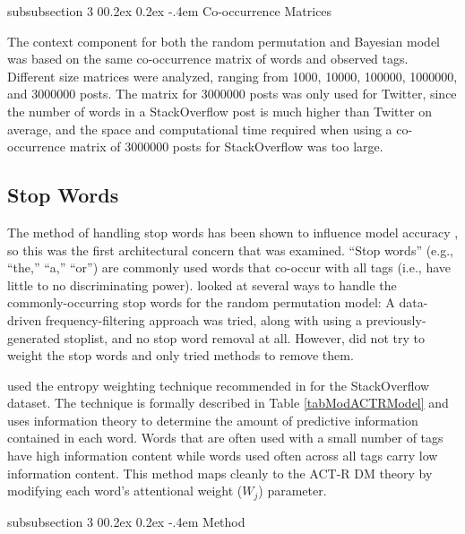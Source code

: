 \documentclass[man,floatsintext,donotrepeattitle]{apa6}
\makeatletter
\renewcommand{\subsubsection}{%
  \@startsection
  {subsubsection}%
  {3}%
  {\parindent}%
  {0\baselineskip \@plus 0.2ex \@minus 0.2ex}%
  {-.4em}%
  {\normalfont\normalsize\bfseries\addperi}}
\makeatother
\begin{document}
\subsubsection{Co-occurrence Matrices}

The context component for both the random permutation and Bayesian model was based on the same co-occurrence matrix of words and observed tags.
Different size matrices were analyzed, ranging from \num{1000}, \num{10000}, \num{100000}, \num{1000000}, and \num{3000000} posts.
The matrix for \num{3000000} posts was only used for Twitter, since the number of words in a StackOverflow post is much higher than Twitter on average,
and the space and computational time required when using a co-occurrence matrix of \num{3000000} posts for StackOverflow was too large. 

\subsection{Stop Words}

The method of handling stop words has been shown to influence model accuracy \parencite{Sahlgren2008,Stanley2013,Jones2007}, so this was the first architectural concern that was examined.
``Stop words'' (e.g., ``the,'' ``a,'' ``or'') are commonly used words that co-occur with all tags (i.e., have little to no discriminating power).
\textcite{Sahlgren2008} looked at several ways to handle the commonly-occurring stop words for the random permutation model:
A data-driven frequency-filtering approach was tried, along with using a previously-generated stoplist, and no stop word removal at all.
However, \citeauthor{Sahlgren2008} did not try to weight the stop words and only tried methods to remove them.

\textcite{Stanley2013} used the entropy weighting technique recommended in \textcite{Dumais1991} for the StackOverflow dataset.
The technique is formally described in Table \ref{tabModACTRModel} and uses information theory to determine the amount of predictive information contained in each word.
Words that are often used with a small number of tags have high information content while words used often across all tags carry low information content.
This method maps cleanly to the ACT-R DM theory by modifying each word's attentional weight ($W_{j}$) parameter.

\subsubsection{Method}
\end{document}
